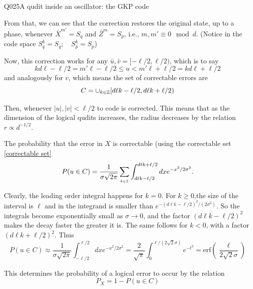 \begin{entry}{Q025}{A qudit inside an oscillator: the GKP code}
\begin{solution}[Part (b)]
From that, we can see that the correction restores the original state, up to a phase, whenever $\bar X^{m'}=S_q$ and $\bar Z^{m}=S_p$, i.e., $m ,m'\equiv 0 \mod d.$ (Notice in the code space $S^k_q=S_q;\quad S^k_p=S_p$)

Now, this correction works for any $\bar u, \bar v = [-\ell/2 , \ell/2)$, which is to say 
$$kd\ell- \ell/2=m'\ell- \ell/2\leq u < m'\ell +\ell/2=kd\ell +\ell/2$$ and analogously for $v$, which means the set of correctable errors are 
\begin{equation}
    C = \cup_{k \in \mathbb{Z}} [d\ell k-\ell/2 , d\ell k+\ell/2)
    \label{correctable set}
\end{equation}

Then, whenever $|u|,|v|< \ell/2$ to code is corrected. This means that as the dimension of the logical qudits increases, the radius decreases by the relation $r\propto d^{-1/2}$.
\end{solution}

\begin{solution}[Part (c)]
The probability that the error in $X$ is correctable (using the correctable set \eqref{correctable set}
\begin{equation}
    P(u \in C) = \frac{1}{\sigma \sqrt{2\pi}}\sum_{_{k \in \mathbb{Z}}} \int_{d\ell k-\ell/2}^{d\ell k+\ell/2} dx e^{-x^2/2\sigma^2}.
\end{equation}

Clearly, the leading order integral happens for $k=0$. For $k\geq0$,the size of the interval is $\ell$ and in the integrand is smaller than $e^{-(d\ell k-\ell/2)^2/(2\sigma^2)}$. So the integrals become exponentially small as $\sigma \rightarrow 0$, and the factor $(d\ell k-\ell/2)^2$ makes the decay faster the greater it is. The same follows for $k<0$, with a factor $(d\ell k+\ell/2)^2$. Thus
\begin{equation}
    P(u \in C) \approx \frac{1}{\sigma \sqrt{2\pi}} \int_{-\ell/2}^{\ell/2} dx e^{-x^2/2\sigma^2}= \frac{2}{\sqrt{\pi}} \int_{0}^{\ell/(2\sqrt{2}\sigma)} e^{-t^2} = \text{erf
}\left(\frac{\ell}{2\sqrt{2}\sigma}\right)
\end{equation}

This determines the probability of a logical error to occur by the relation
\begin{equation}
    P_X = 1 -P(u \in C)
\end{equation}


\end{solution}

\begin{solution}[Part (d)]


\end{solution}
\end{entry}
